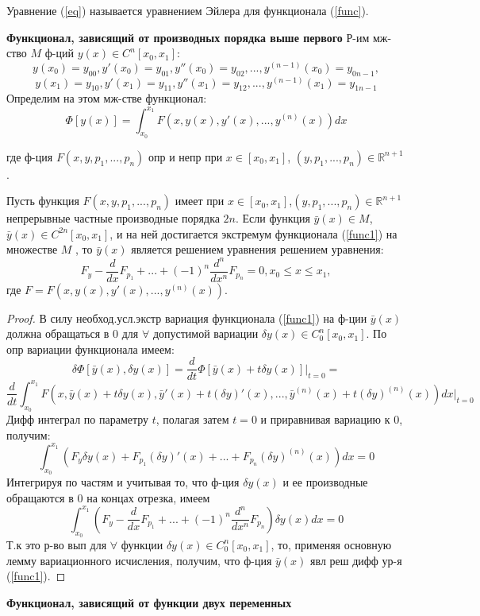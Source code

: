 Уравнение (\ref{eq}) называется уравнением Эйлера для функционала (\ref{func}).

\textbf{Функционал, зависящий от производных порядка выше
первого}
Р-им мж-ство $M$ ф-ций $y(x) \in C^n[x_0, x_1]:$
$$y(x_0) = y_{00} , y'(x_0) = y_{01}, y''(x_0) = y_{02},..., y^{(n-1)}(x_0) = y_{0n-1},$$
$$y(x_1) = y_{10} , y'(x_1) = y_{11}, y''(x_1) = y_{12},..., y^{(n-1)}(x_1) = y_{1n-1}$$
Определим на этом мж-стве функционал:
\begin{equation}
    \Phi[y(x)]=\int_{x_0}^{x_1}F(x,y(x),y'(x),...,y^{(n)}(x))dx
    \label{func1}
\end{equation}

где ф-ция $F(x,y,p_1,...,p_n)$ опр и непр при $x \in [x_0, x_1]$,
$(y,p_1,..., p_n) \in \mathbb{R}^{n+1}$.
\begin{theorem}
    Пусть функция $F(x,y,p_1,...,p_n)$ имеет при $x\in[x_0, x_1]$,$(y,p_1,..., p_n) \in \mathbb{R}^{n+1}$ непрерывные частные производные порядка $2n$. Если функция $\bar y(x) \in M$, $\bar y(x) \in C^{2n}[x_0, x_1]$, и на ней достигается экстремум функционала (\ref{func1}) на множестве $M$ , то $\bar y(x)$ является решением уравнения
    решением уравнения:
    $$F_y-\frac{d}{dx}F_{p_1}+...+(-1)^n\frac{d^n}{dx^n}F_{p_n}=0, x_0 \leq x \leq x_1,$$
    где $F = F(x,y(x),y'(x),..., y^{(n)}(x))$.
\end{theorem}
\begin{proof}
    В силу необход.усл.экстр вариация
    функционала (\ref{func1}) на ф-ции $\bar y(x)$ должна обращаться в 0 для
    $\forall$ допустимой вариации $\delta y(x) \in C^n_0[x_0, x_1]$.
    По опр вариации функционала имеем:
    $$\delta\Phi[\bar y(x), \delta y(x)]=\frac{d}{dt}\Phi[\bar y(x)+t\delta y(x)]\Big|_{t=0}=$$
    $$\frac{d}{dt}\int_{x_0}^{x_1}F(x,\bar y(x) + t\delta y(x), \bar y'(x)+t(\delta y)'(x),...,\bar y^{(n)}(x)+t(\delta y)^{(n)}(x))dx\Big|_{t=0}$$
    Дифф интеграл по параметру $t$, полагая затем $t = 0$ и приравнивая вариацию к 0, получим:
    $$\int_{x_0}^{x_1}(F_y\delta y(x) + F_{p_1}(\delta y)'(x)+...+F_{p_n}(\delta y)^{(n)}(x))dx=0$$
    Интегрируя по частям и учитывая то, что ф-ция $\delta y(x)$ и ее производные обращаются в 0 на концах отрезка, имеем
    $$\int_{x_0}^{x_1} (F_y-\frac{d}{dx}F_{p_1}+...+(-1)^n\frac{d^n}{dx^n}F_{p_n})\delta y(x) dx=0$$
    Т.к это р-во вып для $\forall$ функции $\delta y(x) \in C^n_0[x_0, x_1]$,
    то, применяя основную лемму вариационного исчисления, получим, что
    ф-ция $\bar y(x)$ явл реш дифф ур-я (\ref{func1}).
\end{proof}
\textbf{Функционал, зависящий от функции двух переменных}

